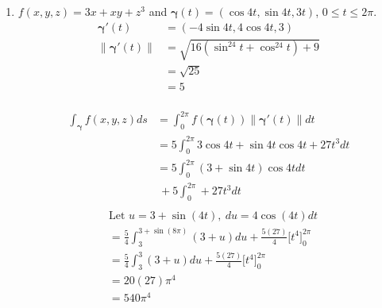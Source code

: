 \documentclass{article}
\newcommand{\norm}[1]{\| #1 \|}
\begin{document}
\begin{enumerate}
\begin{enumerate}
    \item $f(x,y,z) = 3x + xy + z^3$ and $\boldsymbol{\gamma}(t) = ( \cos 4t, \sin 4t, 3t)$, $0 \leq t \leq 2\pi$.
    \begin{align*} 
        \boldsymbol{\gamma}'(t) &= (-4 \sin 4t, 4 \cos 4t, 3) \\
        \norm{\boldsymbol{\gamma}'(t)} &= \sqrt{16( \sin^24t + \cos^24t) + 9} \\
        &= \sqrt{25} \\
        &= 5 \\
    \end{align*}
    \begin{multicols}{2} 
    \noindent
    \begin{align*} 
        \int_{\boldsymbol{\gamma}}f(x,y,z)ds &= \int_0^{2\pi} f(\boldsymbol{\gamma}(t)) \norm{\boldsymbol{\gamma}'(t)}dt \\
        &= 5 \int_0^{2\pi} 3\cos 4t + \sin 4t \cos 4t + 27t^3 dt\\
        &= 5 \int_0^{2\pi} (3 + \sin 4t) \cos 4t dt \\ 
        &\: +5 \int_0^{2\pi} + 27t^3 dt\\
    \end{align*}
    \begin{align*} 
        &\text{Let } u = 3 + \sin(4t),\: du = 4\cos(4t)dt \\
        &= \frac{5}{4} \int_3^{3 + \sin(8\pi)} (3 + u) du + \frac{5(27)}{4}\Big[t^4\Big]_0^{2\pi}\\
        &= \frac{5}{4} \int_3^{3} (3 + u) du + \frac{5(27)}{4}\Big[t^4\Big]_0^{2\pi}\\
        &= 20(27)\pi^4 \\
        &= 540\pi^4 \\
    \end{align*}
    \end{multicols}
    

\end{enumerate}
\end{enumerate}
\end{document}
